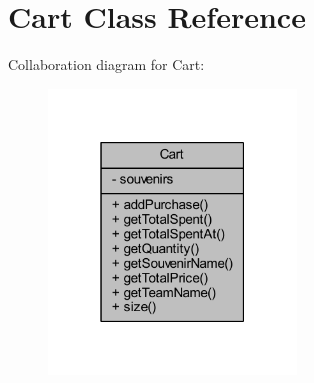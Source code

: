 \hypertarget{class_cart}{}\section{Cart Class Reference}
\label{class_cart}


Collaboration diagram for Cart\+:\nopagebreak
\begin{figure}[H]
\begin{center}
\leavevmode
\includegraphics[width=187pt]{class_cart__coll__graph}
\end{center}
\end{figure}
